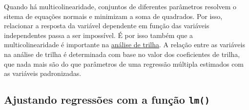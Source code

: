 \documentclass[
]{book}
\newenvironment{Shaded}{\begin{snugshade}}{\end{snugshade}}
\newcommand{\DecValTok}[1]{\textcolor[rgb]{0.00,0.00,0.81}{#1}}
\newcommand{\KeywordTok}[1]{\textcolor[rgb]{0.13,0.29,0.53}{\textbf{#1}}}
\newcommand{\NormalTok}[1]{#1}
\newcommand{\OperatorTok}[1]{\textcolor[rgb]{0.81,0.36,0.00}{\textbf{#1}}}
\newcommand{\StringTok}[1]{\textcolor[rgb]{0.31,0.60,0.02}{#1}}
\begin{document}
\begin{Shaded}
\end{Shaded}

Quando há multicolinearidade, conjuntos de diferentes parâmetros resolvem o sitema de equações normais e minimizam a soma de quadrados. Por isso, relacionar a resposta da variável dependente em função das variáveis independentes passa a ser impossível. É por isso também que a multicolinearidade é importante na \protect\hyperlink{analise-de-trilha}{análise de trilha}. A relação entre as variáveis na análise de trilha é determinada com base no valor dos coeficientes de trilha, que nada mais são do que parâmetros de uma regressão múltipla estimados com as variáveis padronizadas.

\hypertarget{ajustando-regressuxf5es-com-a-funuxe7uxe3o-lm}{%
\subsection{\texorpdfstring{Ajustando regressões com a função \texttt{lm()}}{Ajustando regressões com a função lm()}}\label{ajustando-regressuxf5es-com-a-funuxe7uxe3o-lm}}
\end{document}
